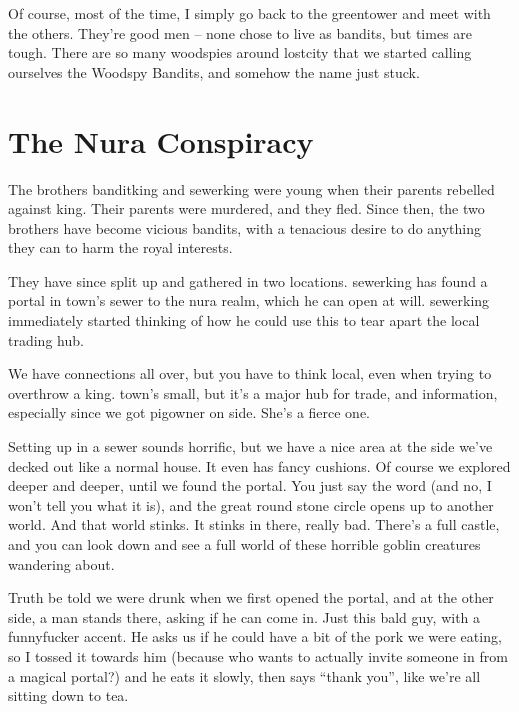 \begin{multicols}{2}
\begin{exampletext}
	Of course, most of the time, I simply go back to the \gls{greentower} and meet with the others.
	They're good men -- none chose to live as bandits, but times are tough.
	There are so many woodspies around \gls{lostcity} that we started calling ourselves the Woodspy Bandits, and somehow the name just stuck.

\end{exampletext}

\end{multicols}

\section{The Nura Conspiracy}

\begin{multicols}{2}

\noindent
The brothers \gls{banditking} and \gls{sewerking} were young when their parents rebelled against \gls{king}.
Their parents were murdered, and they fled.
Since then, the two brothers have become vicious bandits, with a tenacious desire to do anything they can to harm the royal interests.

They have since split up and gathered in two locations.
\Gls{sewerking} has found a portal in \gls{town}'s sewer to the nura realm, which he can open at will.
\Gls{sewerking} immediately started thinking of how he could use this to tear apart the local trading hub.

\begin{exampletext}

	We have connections all over, but you have to think local, even when trying to overthrow a king.
	\Gls{town}'s small, but it's a major hub for trade, and information, especially since we got \gls{pigowner} on side.
	She's a fierce one.

	Setting up in a sewer sounds horrific, but we have a nice area at the side we've decked out like a normal house.
	It even has fancy cushions.
	Of course we explored deeper and deeper, until we found the portal.
	You just say the word (and no, I won't tell you what it is), and the great round stone circle opens up to another world.
	And that world stinks.
	It stinks in there, really bad.
	There's a full castle, and you can look down and see a full world of these horrible goblin creatures wandering about.

	Truth be told we were drunk when we first opened the portal, and at the other side, a man stands there, asking if he can come in.
	Just this bald guy, with a funnyfucker accent.
	He asks us if he could have a bit of the pork we were eating, so I tossed it towards him (because who wants to actually invite someone in from a magical portal?) and he eats it slowly, then says ``thank you'', like we're all sitting down to tea.


\end{exampletext}
\end{multicols}
